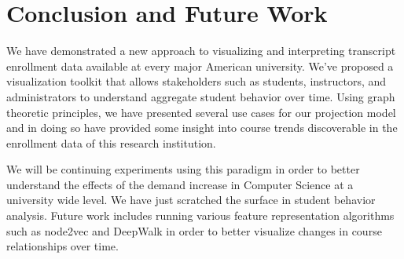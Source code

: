 \documentclass{sigchi}
\begin{document}

\section{Conclusion and Future Work}
\label{sec:conclusion}
We have demonstrated a new approach to visualizing and interpreting transcript enrollment data available at every major American university. We've proposed a visualization toolkit that allows stakeholders such as students, instructors, and administrators to understand aggregate student behavior over time. Using graph theoretic principles, we have presented several use cases for our projection model and in doing so have provided some insight into course trends discoverable in the enrollment data of this research institution.

We will be continuing experiments using this paradigm in order to better understand the effects of the demand increase in Computer Science at a university wide level. We have just scratched the surface in student behavior analysis. Future work includes running various feature representation algorithms such as node2vec and DeepWalk in order to better visualize changes in course relationships over time.

\balance{}


\end{document}
